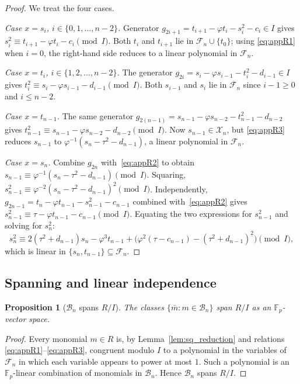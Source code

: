 \documentclass[11pt,a4paper]{article}
\newtheorem{proposition}[theorem]{Proposition}
\theoremstyle{definition}
\newcommand{\F}{\mathbb{F}}
\begin{document}
\begin{proof}
We treat the four cases.

\medskip
\noindent\emph{Case $x = s_i$, $i \in \{0, 1, \ldots, n-2\}$.}
Generator $g_{2i+1} = t_{i+1} - \varphi t_i - s_i^2 - c_i \in I$
gives $s_i^2 \equiv t_{i+1} - \varphi t_i - c_i \pmod{I}$. Both
$t_i$ and $t_{i+1}$ lie in $\mathcal{F}_n \cup \{t_0\}$; using
\eqref{eq:appR1} when $i = 0$, the right-hand side reduces to a linear
polynomial in $\mathcal{F}_n$.

\medskip
\noindent\emph{Case $x = t_i$, $i \in \{1, 2, \ldots, n-2\}$.}
The generator $g_{2i} = s_i - \varphi s_{i-1} - t_i^2 - d_{i-1} \in I$
gives $t_i^2 \equiv s_i - \varphi s_{i-1} - d_{i-1} \pmod{I}$. Both
$s_{i-1}$ and $s_i$ lie in $\mathcal{F}_n$ since $i - 1 \geq 0$ and
$i \leq n - 2$.

\medskip
\noindent\emph{Case $x = t_{n-1}$.}
The same generator $g_{2(n-1)} = s_{n-1} - \varphi s_{n-2} -
t_{n-1}^2 - d_{n-2}$ gives $t_{n-1}^2 \equiv s_{n-1} - \varphi
s_{n-2} - d_{n-2} \pmod{I}$. Now $s_{n-1} \in \mathcal{X}_n$, but
\eqref{eq:appR3} reduces $s_{n-1}$ to $\varphi^{-1} (s_n - \tau^2 -
d_{n-1})$, a linear polynomial in $\mathcal{F}_n$.

\medskip
\noindent\emph{Case $x = s_n$.}
Combine $g_{2n}$ with~\eqref{eq:appR2} to obtain
$s_{n-1} \equiv \varphi^{-1}(s_n - \tau^2 - d_{n-1}) \pmod{I}$.
Squaring,
$s_{n-1}^2 \equiv \varphi^{-2} (s_n - \tau^2 - d_{n-1})^2 \pmod{I}$.
Independently, $g_{2n-1} = t_n - \varphi t_{n-1} - s_{n-1}^2 - c_{n-1}$
combined with~\eqref{eq:appR2} gives
$s_{n-1}^2 \equiv \tau - \varphi t_{n-1} - c_{n-1} \pmod{I}$.
Equating the two expressions for $s_{n-1}^2$ and solving for $s_n^2$:
\[
s_n^2 \equiv 2(\tau^2 + d_{n-1}) s_n - \varphi^3 t_{n-1}
+ \bigl(\varphi^2(\tau - c_{n-1}) - (\tau^2 + d_{n-1})^2\bigr)
\pmod{I},
\]
which is linear in $\{s_n, t_{n-1}\} \subseteq \mathcal{F}_n$.
\end{proof}

\subsection{Spanning and linear independence}\label{app:dreg:basis_proof}

\begin{proposition}[$\mathcal{B}_n$ spans $R/I$]\label{prop:span}
The classes $\{\bar m : m \in \mathcal{B}_n\}$ span $R/I$ as an
$\F_p$-vector space.
\end{proposition}

\begin{proof}
Every monomial $m \in R$ is, by Lemma~\ref{lem:sq_reduction} and
relations \eqref{eq:appR1}--\eqref{eq:appR3}, congruent modulo $I$ to a
polynomial in the variables of $\mathcal{F}_n$ in which each variable
appears to power at most $1$. Such a polynomial is an
$\F_p$-linear combination of monomials in $\mathcal{B}_n$. Hence
$\mathcal{B}_n$ spans $R/I$.
\end{proof}
\end{document}
